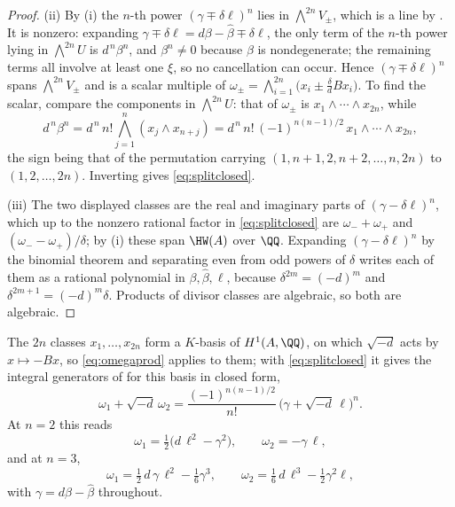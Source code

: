 \begin{proof}
(ii) By (i) the $n$-th power $(\gamma\mp\delta\ell)^{n}$ lies in
$\bigwedge^{2n}V_{\pm}$, which is a line by . It is
nonzero: expanding $\gamma\mp\delta\ell=d\beta-\widehat{\beta}\mp\delta\ell$,
the only term of the $n$-th power lying in $\bigwedge^{2n}U$ is
$d^{\,n}\beta^{n}$, and $\beta^{n}\ne0$ because $\beta$ is nondegenerate;
the remaining terms all involve at least one $\xi$, so no cancellation can
occur. Hence $(\gamma\mp\delta\ell)^{n}$ spans $\bigwedge^{2n}V_{\pm}$ and is a
scalar multiple of $\omega_{\pm}=\bigwedge_{i=1}^{2n}\bigl(x_{i}\pm\tfrac{\delta}{d}Bx_{i}\bigr)$.
To find the scalar, compare the components in $\bigwedge^{2n}U$: that of
$\omega_{\pm}$ is $x_{1}\wedge\cdots\wedge x_{2n}$, while
\[
  d^{\,n}\beta^{n}=d^{\,n}\,n!\bigwedge_{j=1}^{n}(x_{j}\wedge x_{n+j})
  =d^{\,n}\,n!\,(-1)^{n(n-1)/2}\,x_{1}\wedge\cdots\wedge x_{2n},
\]
the sign being that of the permutation carrying
$(1,n+1,2,n+2,\dots,n,2n)$ to $(1,2,\dots,2n)$. Inverting gives
\eqref{eq:splitclosed}.

(iii) The two displayed classes are the real and imaginary parts of
$(\gamma-\delta\ell)^{n}$, which up to the nonzero rational factor in
\eqref{eq:splitclosed} are $\omega_{-}+\omega_{+}$ and
$(\omega_{-}-\omega_{+})/\delta$; by (i) these span
$\HW(A)$ over $\QQ$. Expanding $(\gamma-\delta\ell)^{n}$ by the binomial
theorem and separating even from odd powers of $\delta$ writes each of them as
a rational polynomial in $\beta,\widehat{\beta},\ell$, because
$\delta^{2m}=(-d)^{m}$ and $\delta^{2m+1}=(-d)^{m}\delta$. Products of divisor
classes are algebraic, so both are algebraic.
\end{proof}

\begin{example}\label{ex:splitsmall}
The $2n$ classes $x_{1},\dots,x_{2n}$ form a $K$-basis of $H^{1}(A,\QQ)$, on
which $\sqrt{-d}$ acts by $x\mapsto-Bx$, so \eqref{eq:omegaprod} applies to
them; with \eqref{eq:splitclosed} it gives the integral generators of
 for this basis in closed form,
\[
  \omega_{1}+\sqrt{-d}\,\omega_{2}
  =\frac{(-1)^{n(n-1)/2}}{n!}\,\bigl(\gamma+\sqrt{-d}\,\ell\bigr)^{n}.
\]
At $n=2$ this reads
\[
  \omega_{1}=\tfrac12\bigl(d\,\ell^{2}-\gamma^{2}\bigr),
  \qquad
  \omega_{2}=-\gamma\,\ell,
\]
and at $n=3$,
\[
  \omega_{1}=\tfrac12\,d\,\gamma\,\ell^{2}-\tfrac16\gamma^{3},
  \qquad
  \omega_{2}=\tfrac16\,d\,\ell^{3}-\tfrac12\gamma^{2}\ell,
\]
with $\gamma=d\beta-\widehat{\beta}$ throughout.
\end{example}


